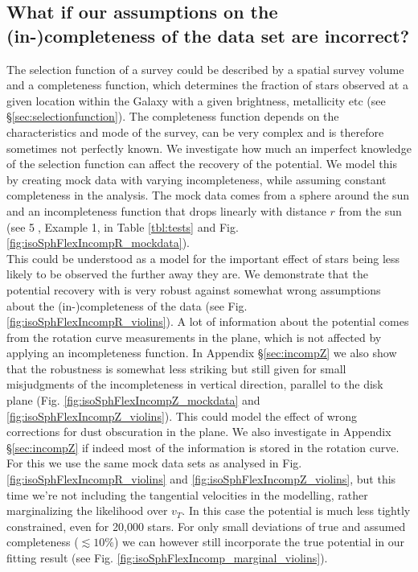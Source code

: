 \subsection{What if our assumptions on the (in-)completeness of the data set are incorrect?} \label{sec:results_incompR}

The selection function of a survey could be described by a spatial survey volume and a completeness function, which determines the fraction of stars observed at a given location within the Galaxy with a given brightness, metallicity etc (see \S\ref{sec:selectionfunction}). The completeness function depends on the characteristics and mode of the survey, can be very complex and is therefore sometimes not perfectly known. We investigate how much an imperfect knowledge of the selection function can affect the recovery of the potential. We model this by creating mock data with varying incompleteness, while assuming constant completeness in the analysis. The mock data comes from a sphere around the sun and an incompleteness function that drops linearly with distance $r$ from the sun (see \textcircled{5}, Example 1, in Table \ref{tbl:tests} and Fig. \ref{fig:isoSphFlexIncompR_mockdata}).
\\This could be understood as a model for the important effect of stars being less likely to be observed the further away they are. We demonstrate that the potential recovery with \RM is very robust against somewhat wrong assumptions about the (in-)completeness of the data (see Fig. \ref{fig:isoSphFlexIncompR_violins}). A lot of information about the potential comes from the rotation curve measurements in the plane, which is not affected by applying an incompleteness function. In Appendix \S\ref{sec:incompZ} we also show that the robustness is somewhat less striking but still given for small misjudgments of the incompleteness in vertical direction, parallel to the disk plane (Fig. \ref{fig:isoSphFlexIncompZ_mockdata} and \ref{fig:isoSphFlexIncompZ_violins}). This could model the effect of wrong corrections for dust obscuration in the plane. We also investigate in Appendix \S\ref{sec:incompZ} if indeed most of the information is stored in the rotation curve. For this we use the same mock data sets as analysed in Fig. \ref{fig:isoSphFlexIncompR_violins} and \ref{fig:isoSphFlexIncompZ_violins}, but this time we’re not including the tangential velocities in the modelling, rather marginalizing the likelihood over $v_T$. In this case the potential is much less tightly constrained, even for 20,000 stars. For only small deviations of true and assumed completeness ($\lesssim 10\%$) we can however still incorporate the true potential in our fitting result (see Fig. \ref{fig:isoSphFlexIncomp_marginal_violins}). 



